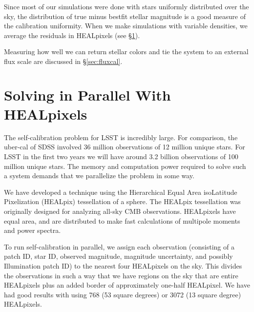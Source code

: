 \documentclass[12pt,preprint]{aastex}
\begin{document}
Since most of our simulations were done with stars uniformly distributed over the sky, the distribution of true minus bestfit stellar magnitude is a good measure of the calibration uniformity.  When we make simulations with variable densities, we average the residuals in HEALpixels (see \S\ref{sec:hp}).

Measuring how well we can return stellar colors and tie the system to an external flux scale are discussed in \S\ref{sec:fluxcal}.



\section{Solving in Parallel With HEALpixels}\label{sec:hp}

The self-calibration problem for LSST is incredibly large.  For comparison, the uber-cal of SDSS involved 36 million observations of 12 million unique stars.  For LSST in the first two years we will have around 3.2 billion observations of 100 million unique stars.  The memory and computation power required to solve such a system demands that we parallelize the problem in some way.

We have developed a technique using the Hierarchical Equal Area isoLatitude Pixelization (HEALpix) tessellation of a sphere.  The HEALpix tessellation was originally designed for analyzing all-sky CMB observations.  HEALpixels have equal area, and are distributed to make fast calculations of multipole moments and power spectra.  

To run self-calibration in parallel, we assign each observation (consisting of a patch ID, star ID, observed magnitude, magnitude uncertainty, and possibly Illumination patch ID) to the nearest four HEALpixels on the sky.  This divides the observations in such a way that we have regions on the sky that are entire HEALpixels plus an added border of approximately one-half HEALpixel.  We have had good results with using 768 (53 square degrees) or 3072 (13 square degree) HEALpixels.  
\end{document}
